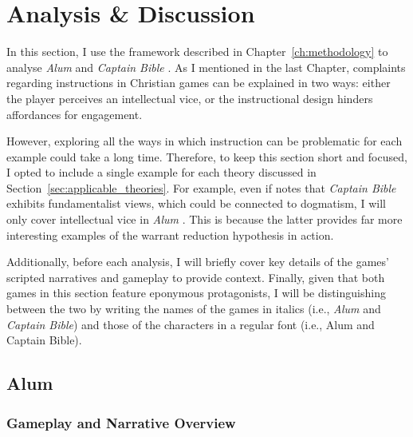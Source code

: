 \chapter{Analysis \& Discussion} \label{ch:analysis_and_discussion}

In this section, I use the framework described in Chapter~\ref{ch:methodology} to analyse \textit{Alum} \parencite{orsie_alum_2006} and \textit{Captain Bible} \parencite{engelbrite_captain_1994}. As I mentioned in the last Chapter, complaints regarding instructions in Christian games can be explained in two ways: either the player perceives an intellectual vice, or the instructional design hinders affordances for engagement. 

However, exploring all the ways in which instruction can be problematic for each example could take a long time. Therefore, to keep this section short and focused, I opted to include a single example for each theory discussed in Section~\ref{sec:applicable_theories}. For example, even if \textcite{censorious_idler_captain_2018} notes that \textit{Captain Bible} \parencite{engelbrite_captain_1994} exhibits fundamentalist views, which could be connected to dogmatism, I will only cover intellectual vice in \textit{Alum} \parencite{orsie_alum_2006}. This is because the latter provides far more interesting examples of the warrant reduction hypothesis in action.

Additionally, before each analysis, I will briefly cover key details of the games’ scripted narratives and gameplay to provide context. Finally, given that both games in this section feature eponymous protagonists, I will be distinguishing between the two by writing the names of the games in italics (i.e., \textit{Alum} and \textit{Captain Bible}) and those of the characters in a regular font (i.e., Alum and Captain Bible).

\section{Alum}

\subsection{Gameplay and Narrative Overview}

